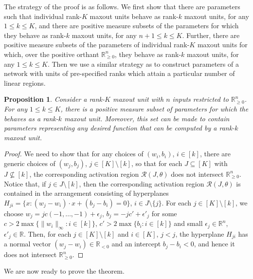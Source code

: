 \documentclass{article}
\newtheorem{proposition}[theorem]{Proposition}
\theoremstyle{definition}
\begin{document}
\theorempositivemeasure*

The strategy of the proof is as follows. We first show that there are parameters such that individual rank-$K$ maxout units behave as rank-$k$ maxout units, for any $1\leq k\leq K$, and there are positive measure subsets of the parameters for which they behave as rank-$k$ maxout units, for any $n+1\leq k\leq K$.
Further, there are positive measure subsets of the parameters of individual rank-$K$ maxout units for which, over the positive orthant $\mathbb{R}^n_{\geq0}$, they behave as rank-$k$ maxout units, for any $1\leq k\leq K$.
Then we use a similar strategy as \citet{sharp2021} to construct parameters of a network with units of pre-specified ranks which attain a particular number of linear regions. 

\begin{proposition}
\label{prop:genericposorth}
Consider a rank-$K$ maxout unit with $n$ inputs restricted to $\mathbb{R}^n_{\geq0}$. 
For any $1\leq k\leq K$, there is a positive measure subset of parameters for which the behaves as a rank-$k$ maxout unit. Moreover, this set can be made to contain parameters representing any desired function that can be computed by a rank-$k$ maxout unit.
\end{proposition}
\begin{proof}
We need to show that for any choices of $(w_i,b_i)$, $i\in[k]$, there are generic choices of $(w_j,b_j)$, $j\in[K]\setminus[k]$, so that for each $J\subseteq[K]$ with $J\not\subseteq [k]$, the corresponding activation region $\mathcal{R}(J, \theta)$ does not intersect $\mathbb{R}^n_{\geq0}$.
Notice that, if $j\in J\setminus[k]$, then the corresponding activation region $\mathcal{R}(J,\theta)$ is contained in the arrangement consisting of hyperplanes $H_{ji} = \{x\colon (w_j-w_i)\cdot x +(b_j-b_i) =0 \}$, $i\in J\setminus\{j\}$.
For each $j\in[K]\setminus[k]$, we choose $w_j = j c (-1,\ldots, -1)+\epsilon_j$, $b_j=-j c'+\epsilon'_j$ for some $c > 2\max\{\|w_{i}\|_\infty \colon i\in[k]\}$, $c'>2\max\{b_i\colon i\in [k]\}$ and small $\epsilon_j\in\mathbb{R}^n$, $\epsilon'_j\in\mathbb{R}$.
Then, for each $j\in [K]\setminus[k]$ and $i\in[K]$, $j<j$, the hyperplane $H_{ji}$ has a normal vector $(w_j-w_i)\in\mathbb{R}_{<0}$ and an intercept $b_j-b_i<0$, and hence it does not intersect $\mathbb{R}^{n}_{\geq0}$. 
\end{proof}

We are now ready to prove the theorem. 
\end{document}
